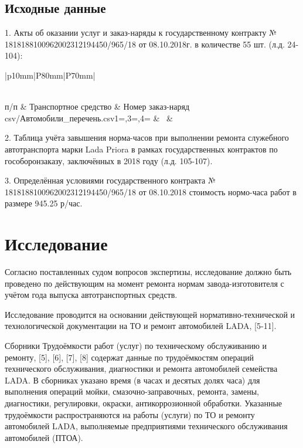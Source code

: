 \subsection{Исходные данные}

1. Акты об оказании услуг и заказ-наряды к государственному контракту № 1818188100962002312194450/965/18 от 08.10.2018г. в количестве 55 шт. (л.д. 24-104):


\begin{longtable}{|p{10mm}|P{80mm}|P{70mm}|}
	\caption[]{\footnotesize {\textbf{Перечень транспортных средств и соответствующих им актов об оказании услуг и заказ-нарядов к государственному контракту № 1818188100962002312194450/965/18 от 08.10.2018. }}} \label{tab:hist}\\
	\hline%
	п/п	& Транспортное средство & Номер заказ-наряд\\\hline\hline\endhead
	\csvreader[separator=semicolon, late after line=\\\hline]%
	{csv/Автомобили_перечень.csv}{1=,3=\firstname,4=\matnumber}%
	{\thecsvrow & \firstname~ & \matnumber}%
	
\end{longtable}




2. Таблица учёта завышения норма-часов при выполнении ремонта служебного автотранспорта марки Lada Priora  в рамках государственных контрактов по гособоронзаказу, заключённых в 2018 году (л.д. 105-107). 

3. Определённая условиями государственного контракта  № 1818188100962002312194450/965/18 от 08.10.2018 стоимость  нормо-часа работ в размере {945.25 р/час}.



\section{Исследование}

Согласно поставленных судом вопросов экспертизы, исследование должно быть проведено по действующим на момент ремонта  нормам завода-изготовителя с учётом года выпуска автотранспортных средств.

Исследование проводится на основании действующей нормативно-технической и технологической документации на ТО и ремонт автомобилей LADA, [5-11].


Сборники Трудоёмкости работ (услуг) по техническому обслуживанию и ремонту, [5], [6], [7], [8] содержат данные по трудоёмкостям операций технического обслуживания, диагностики и ремонта автомобилей семейства LADA.  В сборниках указано время (в часах и десятых долях часа) для выполнения операций мойки, смазочно-заправочных, ремонта, замены, диагностики, регулировки, окраски, антикоррозионной обработки.
Указанные трудоёмкости  распространяются на работы (услуги) по ТО и ремонту автомобилей LADA, выполняемые
предприятиями технического обслуживания автомобилей (ПТОА). 

